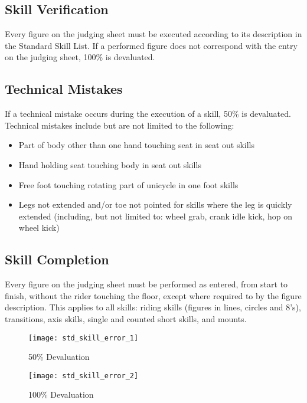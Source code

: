\subsection{Skill Verification}
Every figure on the judging sheet must be executed according to its description in the Standard Skill List.
If a performed figure does not correspond with the entry on the judging sheet, 100\% is devaluated.

\subsection{Technical Mistakes}
If a technical mistake occurs during the execution of a skill, 50\% is devaluated.
Technical mistakes include but are not limited to the following: 
\begin{itemize}
\item Part of body other than one hand touching seat in seat out skills
\item Hand holding seat touching body in seat out skills
\item Free foot touching rotating part of unicycle in one foot skills
\item Legs not extended and/or toe not pointed for skills where the leg is quickly extended (including, but not limited to: wheel grab, crank idle kick, hop on wheel kick)
\end{itemize}

\subsection{Skill Completion \label{subsec:freestyle_difficulty-devaluations_skill-completion}}
Every figure on the judging sheet must be performed as entered, from start to finish, without the rider touching the floor, except where required to by the figure description.
This applies to all skills: riding skills (figures in lines, circles and 8's), transitions, axis skills, single and counted short skills, and mounts.

\begin{wrapfigure}{l}{0.35\textwidth}
\vspace{-25pt}
\begin{center}
\texttt{[image: std\_skill\_error\_1]}
\end{center}
\vspace{-20pt}
\caption{50\% Devaluation \label{fig:std_skill_error_1}}
\vspace{-5pt}
\begin{center}
\texttt{[image: std\_skill\_error\_2]}
\end{center}
\vspace{-20pt}
\caption{100\% Devaluation\label{fig:std_skill_error_2}}
\vspace{-25pt}
\end{wrapfigure}

